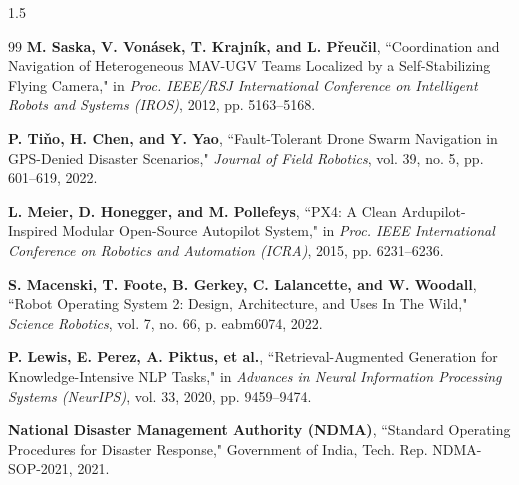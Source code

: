 \begin{spacing}{1.5}
\begin{thebibliography}{99}
 \textbf{M. Saska, V. Von\'{a}sek, T. Krajn\'{i}k, and L. P\v{r}eu\v{c}il}, ``Coordination and Navigation of Heterogeneous MAV-UGV Teams Localized by a Self-Stabilizing Flying Camera," in \textit{Proc. IEEE/RSJ International Conference on Intelligent Robots and Systems (IROS)}, 2012, pp. 5163--5168.

 \textbf{P. Ti\v{n}o, H. Chen, and Y. Yao}, ``Fault-Tolerant Drone Swarm Navigation in GPS-Denied Disaster Scenarios," \textit{Journal of Field Robotics}, vol. 39, no. 5, pp. 601--619, 2022.

 \textbf{L. Meier, D. Honegger, and M. Pollefeys}, ``PX4: A Clean Ardupilot-Inspired Modular Open-Source Autopilot System," in \textit{Proc. IEEE International Conference on Robotics and Automation (ICRA)}, 2015, pp. 6231--6236.

 \textbf{S. Macenski, T. Foote, B. Gerkey, C. Lalancette, and W. Woodall}, ``Robot Operating System 2: Design, Architecture, and Uses In The Wild," \textit{Science Robotics}, vol. 7, no. 66, p. eabm6074, 2022.

 \textbf{P. Lewis, E. Perez, A. Piktus, et al.}, ``Retrieval-Augmented Generation for Knowledge-Intensive NLP Tasks," in \textit{Advances in Neural Information Processing Systems (NeurIPS)}, vol. 33, 2020, pp. 9459--9474.

 \textbf{National Disaster Management Authority (NDMA)}, ``Standard Operating Procedures for Disaster Response," Government of India, Tech. Rep. NDMA-SOP-2021, 2021.

\end{thebibliography}
\end{spacing}
	
\nocite{*}
